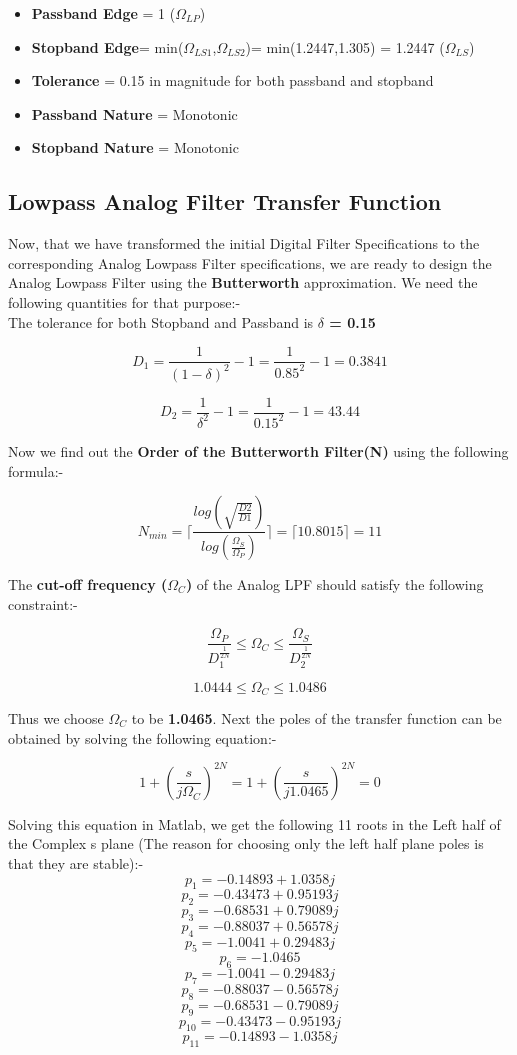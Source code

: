 \documentclass[12pt]{article}
\begin{document}
\begin{itemize}
    \item \textbf{Passband Edge} = 1 ($\Omega_{LP}$)
    \item \textbf{Stopband Edge}= min($\Omega_{LS1}$,$\Omega_{LS2}$)= min(1.2447,1.305) = 1.2447 ($\Omega_{LS}$)
    \item\textbf{Tolerance} = 0.15 in magnitude for both passband and stopband
    \item \textbf{Passband Nature} = Monotonic
    \item \textbf{Stopband Nature} = Monotonic
\end{itemize}

\subsection{Lowpass Analog Filter Transfer Function}
Now, that we have transformed the initial Digital Filter Specifications to the corresponding Analog Lowpass Filter specifications, we are ready to design the Analog Lowpass Filter using the \textbf{Butterworth} approximation. We need the following quantities for that purpose:-\\
The tolerance for both Stopband and Passband is \textbf{$\delta$ = 0.15}


\[D_{1} = \frac{1}{(1 - \delta)^2} - 1 = \frac{1}{0.85^2} - 1 = 0.3841\]



\[D_{2} = \frac{1}{\delta^2} - 1 = \frac{1}{0.15^2} - 1 = 43.44\]


Now we find out the \textbf{Order of the Butterworth Filter(N)} using the following formula:-
\newpage


\[N_{min} = \lceil \frac{log(\sqrt{\frac{D2}{D1}})}{log(\frac{\Omega_{S}}{\Omega_{P}})} \rceil = \lceil 10.8015 \rceil = 11\]


The \textbf{cut-off frequency ($\Omega_{C}$)} of the Analog LPF should satisfy the following constraint:-


\[\frac{\Omega_{P}}{D_{1}^{\frac{1}{2N}}} \leq \Omega_{C} \leq \frac{\Omega_{S}}{D_{2}^{\frac{1}{2N}}}\]


\[1.0444 \leq \Omega_{C} \leq 1.0486\]


Thus we choose $\Omega_{C}$ to be \textbf{1.0465}. Next the poles of the transfer function can be obtained by solving the following equation:-

\[1 + (\frac{s}{j\Omega_{C}})^{2N} = 1 + (\frac{s}{j1.0465})^{2N} = 0\]


Solving this equation in Matlab, we get the following 11 roots in the Left half of the Complex s plane (The reason for choosing only the left half plane poles is that they are stable):-
\[p_{1} = -0.14893 + 1.0358j\]
\[p_{2} = -0.43473 + 0.95193j\]
\[p_{3} = -0.68531 + 0.79089j\]
\[p_{4} = -0.88037 + 0.56578j\]
\[p_{5} = -1.0041 + 0.29483j\]
\[p_{6} = -1.0465\]
\[p_{7} = -1.0041 -0.29483j\]
\[p_{8} = -0.88037 - 0.56578j\]
\[p_{9} = -0.68531 - 0.79089j\]
\[p_{10} = -0.43473 - 0.95193j\]
\[p_{11} = -0.14893 - 1.0358j\]
\end{document}
